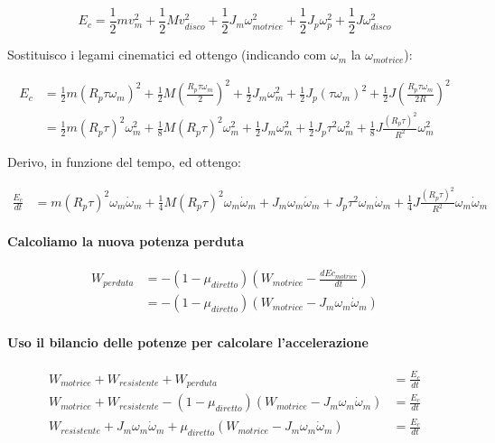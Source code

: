 \documentclass[main.tex]{subfiles}
\begin{document}
\[
  E_c = \frac{1}{2}mv_m^2 + \frac{1}{2}Mv_{disco}^2 + \frac{1}{2}J_m  \omega_{motrice}^2 + \frac{1}{2}J_p \omega_{p}^2 + \frac{1}{2}J \omega_{disco}^2
\]

Sostituisco i legami cinematici ed ottengo  (indicando com $\omega_m$ la  $\omega_{motrice}$):

\begin{align*}
  E_c &= \frac{1}{2}m(R_p\tau\omega_{m})^2 + \frac{1}{2}M(\frac{R_p\tau\omega_{m}}{2})^2 + \frac{1}{2}J_m  \omega_{m}^2 + \frac{1}{2}J_p (\tau\omega_{m})^2 + \frac{1}{2}J (\frac{R_p\tau\omega_{m}}{2R})^2 \\
  &= \frac{1}{2}m(R_p\tau)^2\omega_{m}^2 + \frac{1}{8}M(R_p\tau)^2\omega_{m}^2 + \frac{1}{2}J_m  \omega_{m}^2 + \frac{1}{2}J_p \tau^2\omega_{m}^2 + \frac{1}{8}J \frac{(R_p\tau)^2}{R^2}\omega_{m}^2
\end{align*}

Derivo, in funzione del tempo, ed ottengo:

\begin{align*}
   \frac{E_c}{dt} &= m(R_p\tau)^2\omega_{m}\dot{\omega}_{m} + \frac{1}{4}M(R_p\tau)^2\omega_{m}\dot{\omega}_{m} + J_m  \omega_{m}\dot{\omega}_{m} + J_p \tau^2\omega_{m}\dot{\omega}_{m} + \frac{1}{4}J \frac{(R_p\tau)^2}{R^2}\omega_{m}\dot{\omega}_{m}
\end{align*}

\paragraph{Calcoliamo la nuova potenza perduta}

\begin{align*}
  W_{perduta} &= -(1 - \mu_{diretto})(W_{motrice} - \frac{dEc_{motrice}}{dt}) \\
             &= -(1 - \mu_{diretto})(W_{motrice} -  J_m  \omega_{m}\dot{\omega}_{m})
\end{align*}

\paragraph{Uso il bilancio delle potenze per calcolare l'accelerazione}

\begin{align*}
  W_{motrice} + W_{resistente} + W_{perduta} &=  \frac{E_c}{dt} \\
  W_{motrice} + W_{resistente} -(1 - \mu_{diretto})(W_{motrice} -  J_m  \omega_{m}\dot{\omega}_{m})  &=  \frac{E_c}{dt} \\
  W_{resistente} + J_m  \omega_{m}\dot{\omega}_{m} + \mu_{diretto}(W_{motrice} -  J_m  \omega_{m}\dot{\omega}_{m})  &=  \frac{E_c}{dt} \\
\end{align*}
\end{document}

